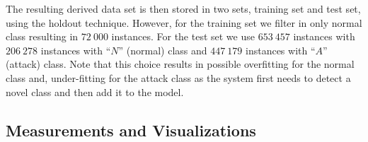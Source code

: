 The resulting derived data set is then stored in two sets,
training set and test set, using the holdout technique.
However, for the training set we filter in only normal class
resulting in $72\:000$ instances.
For the test set we use $653\:457$ instances with
$206\:278$ instances with ``$N$'' (normal) class and
$447\:179$ instances with ``$A$'' (attack) class.
Note that this choice results in possible overfitting for the normal class and,
under-fitting for the attack class as the system first needs to detect a novel class and
then add it to the model.








\subsection{Measurements and Visualizations}

